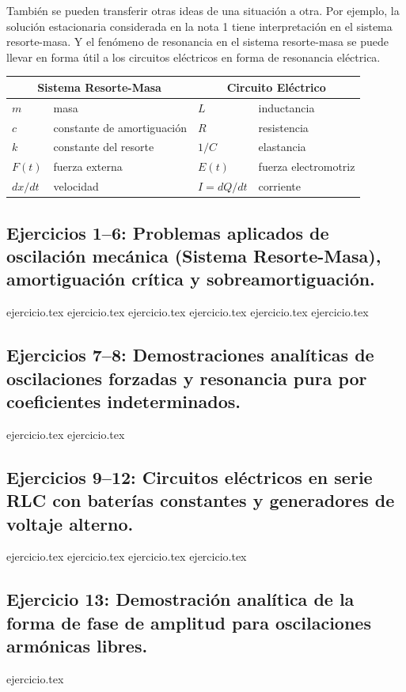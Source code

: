 También se pueden transferir otras ideas de una situación a otra. Por ejemplo, la solución estacionaria considerada en la nota 1 tiene interpretación en el sistema resorte-masa. Y el fenómeno de resonancia en el sistema resorte-masa se puede llevar en forma útil a los circuitos eléctricos en forma de resonancia eléctrica.

\begin{table}[h]
\centering
\begin{tabular}{ll|ll}
\hline
\multicolumn{2}{c|}{\textbf{Sistema Resorte-Masa}} & \multicolumn{2}{c}{\textbf{Circuito Eléctrico}} \\ \hline
$m$ & masa & $L$ & inductancia \\
$c$ & constante de amortiguación & $R$ & resistencia \\
$k$ & constante del resorte & $1/C$ & elastancia \\
$F(t)$ & fuerza externa & $E(t)$ & fuerza electromotriz \\
$dx/dt$ & velocidad & $I = dQ/dt$ & corriente \\ \hline
\end{tabular}
\end{table}

\subsection*{Ejercicios 1--6: Problemas aplicados de oscilación mecánica (Sistema Resorte-Masa), amortiguación crítica y sobreamortiguación.}
\begin{enumerate}
    {ejercicio.tex}
    {ejercicio.tex}
    {ejercicio.tex}
    {ejercicio.tex}
    {ejercicio.tex}
    {ejercicio.tex}
\end{enumerate}

\subsection*{Ejercicios 7--8: Demostraciones analíticas de oscilaciones forzadas y resonancia pura por coeficientes indeterminados.}
\begin{enumerate}
    \setcounter{enumi}{6}
    {ejercicio.tex}
    {ejercicio.tex}
\end{enumerate}

\subsection*{Ejercicios 9--12: Circuitos eléctricos en serie RLC con baterías constantes y generadores de voltaje alterno.}
\begin{enumerate}
    \setcounter{enumi}{8}
    {ejercicio.tex}
    {ejercicio.tex}
    {ejercicio.tex}
    {ejercicio.tex}
\end{enumerate}

\subsection*{Ejercicio 13: Demostración analítica de la forma de fase de amplitud para oscilaciones armónicas libres.}
\begin{enumerate}
    \setcounter{enumi}{12}
    {ejercicio.tex}
\end{enumerate}
